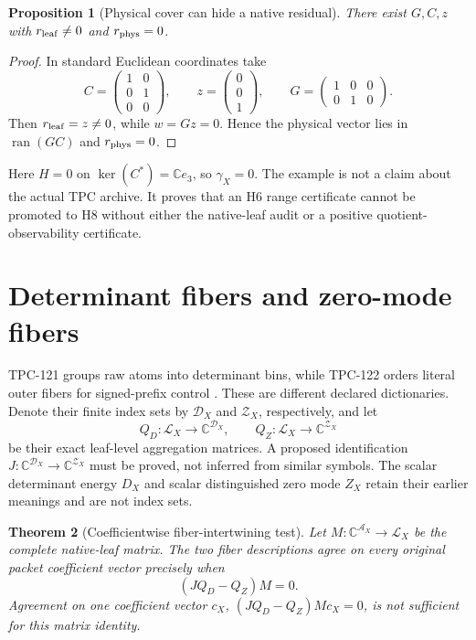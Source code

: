 \documentclass[11pt]{article}
\newtheorem{theorem}{Theorem}[section]
\newtheorem{proposition}[theorem]{Proposition}
\theoremstyle{definition}
\theoremstyle{remark}
\newcommand{\C}{\mathbb C}
\newcommand{\cA}{\mathcal A}
\newcommand{\cL}{\mathcal L}
\newcommand{\Ran}{\operatorname{ran}}
\newcommand{\Ker}{\operatorname{ker}}
\begin{document}
\begin{proposition}[Physical cover can hide a native residual]
\label{prop:camouflage}
There exist \(G,C,z\) with \(r_{\rm leaf}\ne0\) and
\(r_{\rm phys}=0\).
\end{proposition}

\begin{proof}
In standard Euclidean coordinates take
\[
 C=
 \begin{pmatrix}
 1&0\\0&1\\0&0
 \end{pmatrix},
 \qquad
 z=
 \begin{pmatrix}0\\0\\1\end{pmatrix},
 \qquad
 G=
 \begin{pmatrix}
 1&0&0\\0&1&0
 \end{pmatrix}.
\]
Then \(r_{\rm leaf}=z\ne0\), while \(w=Gz=0\).  Hence the physical
vector lies in \(\Ran(GC)\) and \(r_{\rm phys}=0\).
\end{proof}

Here \(H=0\) on \(\Ker(C^*)=\C e_3\), so \(\gamma_X=0\).
The example is not a claim about the actual TPC archive.  It proves
that an H6 range certificate cannot be promoted to H8 without either
the native-leaf audit or a positive quotient-observability
certificate.

\section{Determinant fibers and zero-mode fibers}

TPC-121 groups raw atoms into determinant bins, while TPC-122 orders
literal outer fibers for signed-prefix control
\citep{WangTPC121,WangTPC122}.  These are different declared
dictionaries.  Denote their finite index sets by
\(\mathcal D_X\) and \(\mathcal Z_X\), respectively, and let
\[
 Q_D:\cL_X\to\C^{\mathcal D_X},
 \qquad
 Q_Z:\cL_X\to\C^{\mathcal Z_X}
\]
be their exact leaf-level aggregation matrices.  A proposed
identification
\(J:\C^{\mathcal D_X}\to\C^{\mathcal Z_X}\) must be proved, not
inferred from similar symbols.  The scalar determinant energy
\(D_X\) and scalar distinguished zero mode \(Z_X\) retain their
earlier meanings and are not index sets.

\begin{theorem}[Coefficientwise fiber-intertwining test]
\label{thm:fibers}
Let \(M:\C^{\cA_X}\to\cL_X\) be the complete native-leaf matrix.  The
two fiber descriptions agree on every original packet coefficient
vector precisely when
\[
 \boxed{(JQ_D-Q_Z)M=0.}
\]
Agreement on one coefficient vector \(c_X\),
\((JQ_D-Q_Z)Mc_X=0\), is not sufficient for this matrix identity.
\end{theorem}
\end{document}
